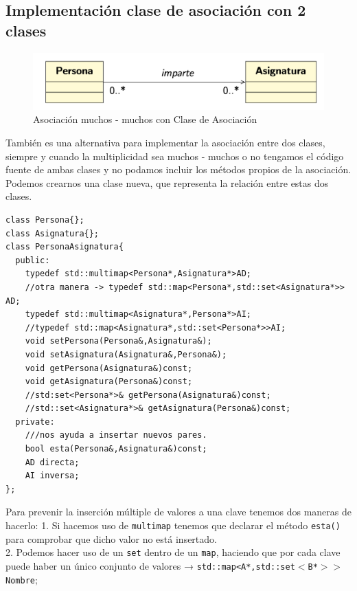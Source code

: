 \subsection{Implementación clase de asociación con 2 clases}

\begin{figure}[h]
	\includegraphics[width=\textwidth]{Imagenes/AClS2.png}
	\caption{Asociación muchos - muchos con Clase de Asociación}
\end{figure}

También es una alternativa para implementar la asociación entre dos clases, siempre y cuando la multiplicidad sea muchos - muchos o no tengamos el código fuente de ambas clases y no podamos incluir los métodos propios de la asociación.\vspace*{0,2cm}\\
Podemos crearnos una clase nueva, que representa la relación entre estas dos clases.
\begin{lstlisting}[frame=single]
class Persona{};
class Asignatura{};
class PersonaAsignatura{
  public:
	typedef std::multimap<Persona*,Asignatura*>AD;
	//otra manera -> typedef std::map<Persona*,std::set<Asignatura*>> AD;
	typedef std::multimap<Asignatura*,Persona*>AI;
	//typedef std::map<Asignatura*,std::set<Persona*>>AI;
	void setPersona(Persona&,Asignatura&);
	void setAsignatura(Asignatura&,Persona&);
	void getPersona(Asignatura&)const;
	void getAsignatura(Persona&)const;
	//std:set<Persona*>& getPersona(Asignatura&)const;
	//std::set<Asignatura*>& getAsignatura(Persona&)const;
  private:
  	///nos ayuda a insertar nuevos pares.
	bool esta(Persona&,Asignatura&)const;
	AD directa;
	AI inversa;
};
\end{lstlisting}
\newpage
Para prevenir la inserción múltiple de valores a una clave tenemos dos maneras de hacerlo:
 1. Si hacemos uso de \texttt{multimap} tenemos que declarar el método \texttt{esta()} para comprobar que dicho valor no está insertado.\vspace*{0,2cm}\\
2. Podemos hacer uso de un \texttt {set} dentro de un \texttt{map}, haciendo que por cada clave puede haber un único conjunto de valores → \texttt{std::map<A*,std::set$<$B*$>$$>$Nombre$;$}


